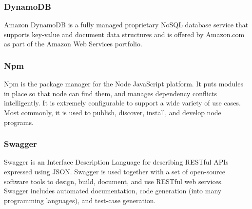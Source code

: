 \subsubsection{DynamoDB}
Amazon DynamoDB is a fully managed proprietary NoSQL database service that supports key-value and document data structures and is offered by Amazon.com as part of the Amazon Web Services portfolio.
\subsubsection{Npm}
Npm is the package manager for the Node JavaScript platform. It puts modules in place so that node can find them, and manages dependency conflicts intelligently.
It is extremely configurable to support a wide variety of use cases. Most commonly, it is used to publish, discover, install, and develop node programs.
\subsubsection{Swagger}
Swagger is an Interface Description Language for describing RESTful APIs expressed using JSON. Swagger is used together with a set of open-source software tools to design, build, document, and use RESTful web services. Swagger includes automated documentation, code generation (into many programming languages), and test-case generation.


